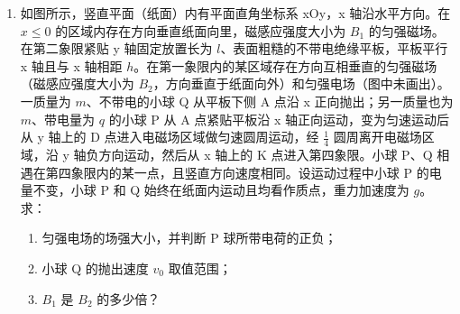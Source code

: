 \documentclass[\gkver]{gaokaozhenti}
\begin{document}
\begin{enumerate}
{（2）A 从 M 到 N 的过程中，B 的电势能增加了 $\Delta E_{p}=0.06\UJ$，则克服电场力做功为 $W=qEs$，$\therefore s=0.3\Um$。

A、B 匀加速直线运动，加速度大小 $a$、运动的位移大小 $s$、末速度大小 $v$ 都相等，$v=\sqrt{2as}=0.6\Ums$。

对 B：$T_{1}-qE-\mu m_{B}g=m_{B}a$，$T_{1}=1.12\UN$。

对 A 到达 N 点时：弹簧的伸长量 $x=ON-OM=\frac{s}{\sin\theta}-s\cot\theta=0.1\Um$。

弹力 $F_{2}=kx=5\times0.1\UN=0.5\UN$。

由牛顿第二定律得：$F+m_{A}g\sin\theta-T_{1}-F_{2}\sin\theta=m_{A}a$，$F=0.88\UN$。

A 到达 N 点时拉力 $F$ 的瞬时功率 $P=Fv=0.88\times0.6\UW=0.528\UW$。
}

\item
如图所示，竖直平面（纸面）内有平面直角坐标系 xOy，x 轴沿水平方向。在 $x\leq0$ 的区域内存在方向垂直纸面向里，磁感应强度大小为 $B_{1}$ 的匀强磁场。在第二象限紧贴 y 轴固定放置长为 $l$、表面粗糙的不带电绝缘平板，平板平行 x 轴且与 x 轴相距 $h$。在第一象限内的某区域存在方向互相垂直的匀强磁场（磁感应强度大小为 $B_{2}$，方向垂直于纸面向外）和匀强电场（图中未画出）。一质量为 $m$、不带电的小球 Q 从平板下侧 A 点沿 x 正向抛出；另一质量也为 $m$、带电量为 $q$ 的小球 P 从 A 点紧贴平板沿 x 轴正向运动，变为匀速运动后从 y 轴上的 D 点进入电磁场区域做匀速圆周运动，经 $\frac{1}{4}$ 圆周离开电磁场区域，沿 y 轴负方向运动，然后从 x 轴上的 K 点进入第四象限。小球 P、Q 相遇在第四象限内的某一点，且竖直方向速度相同。设运动过程中小球 P 的电量不变，小球 P 和 Q 始终在纸面内运动且均看作质点，重力加速度为 $g$。求：
\begin{enumerate}
	\item
	匀强电场的场强大小，并判断 P 球所带电荷的正负；
	\item
	小球 Q 的抛出速度 $v_{0}$ 取值范围；
	\item
	$B_{1}$ 是 $B_{2}$ 的多少倍？
\end{enumerate}


\end{enumerate}
\end{document}
